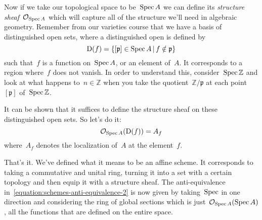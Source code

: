 Now if we take our topological space to be~$\operatorname{Spec} A$ we can define its \emph{structure sheaf}~$\mathcal{O}_{\operatorname{Spec} A}$ which will capture all of the structure we'll need in algebraic geometry. Remember from our varieties course that we have a basis of distinguished open sets, where a distinguished open is defined by
\begin{equation}
  \operatorname{D}(f)=\left\{ [\mathfrak{p}]\in\operatorname{Spec} A\,|\,f\notin\mathfrak{p} \right\}
\end{equation}
such that~$f$ is a function on~$\operatorname{Spec} A$, or an element of~$A$. It corresponds to a region where~$f$ does not vanish. In order to understand this, consider~$\operatorname{Spec}\mathbb{Z}$ and look at what happens to~$n\in\mathbb{Z}$ when you take the quotient~$\mathbb{Z}/\mathfrak{p}$ at each point~$[\mathfrak{p}]$ of~$\operatorname{Spec}\mathbb{Z}$.

It can be shown that it suffices to define the structure sheaf on these distinguished open sets. So let's do it:
\begin{equation}
  \mathcal{O}_{\operatorname{Spec} A}(\operatorname{D}(f))=A_f
\end{equation}
where~$A_f$ denotes the localization of~$A$ at the element~$f$.

That's it. We've defined what it means to be an affine scheme. It corresponds to taking a commutative and unital ring, turning it into a set with a certain topology and then equip it with a structure sheaf. The anti-equivalence in~\eqref{equation:schemes-anti-equivalence-2} is now given by taking~$\operatorname{Spec}$ in one direction and considering the ring of global sections which is just~$\mathcal{O}_{\operatorname{Spec} A}({\operatorname{Spec} A})$, all the functions that are defined on the entire space.
